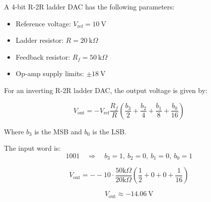 

A 4-bit R-2R ladder DAC has the following parameters:

\begin{itemize}
    \item Reference voltage: $V_{\text{ref}} = 10 \ \text{V}$
    \item Ladder resistor: $R = 20 \ \text{k}\Omega$
    \item Feedback resistor: $R_f = 50 \ \text{k}\Omega$
    \item Op-amp supply limits: $\pm 18 \ \text{V}$
\end{itemize}


\begin{solutionblock}

For an inverting R-2R ladder DAC, the output voltage is given by:

\[
V_{\text{out}} = - V_{\text{ref}} \frac{R_f}{R} \left( \frac{b_3}{2} + \frac{b_2}{4} + \frac{b_1}{8} + \frac{b_0}{16} \right)
\]

Where $b_3$ is the MSB and $b_0$ is the LSB.

The input word is:
\[
1001 \quad \Rightarrow \quad b_3=1, \ b_2=0, \ b_1=0, \ b_0=1
\]

\[
V_{\text{out}} = - -10 \cdot \frac{50\text{k}\Omega}{20\text{k}\Omega} \left( \frac{1}{2} + 0 + 0 + \frac{1}{16}  \right)
\]

\[
\boxed{V_{\text{out}} \approx -14.06 \ \text{V}}
\]

\end{solutionblock}


